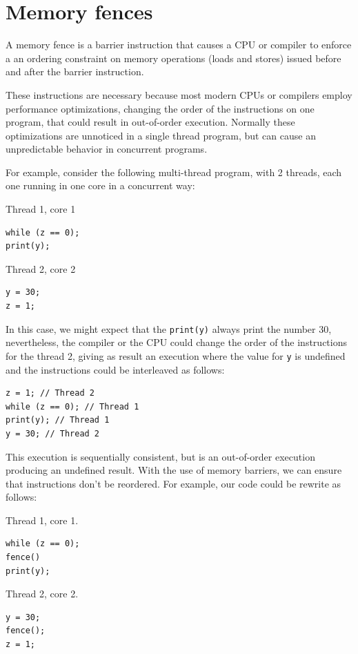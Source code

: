 \documentclass[openany, a4paper]{book}
\theoremstyle{break}
\theoremstyle{example}
\theoremstyle{note}
\theoremstyle{break}
\theoremstyle{exercise}
\begin{document}
\section{Memory fences}
\label{sec:org57f677f}

A memory fence is a barrier instruction that causes a CPU or compiler to
enforce a an ordering constraint on memory operations (loads and stores)
issued before and after the barrier instruction.

These instructions are necessary because most modern CPUs or compilers
employ performance optimizations, changing the order of the instructions on
one program, that could result in out-of-order execution. Normally these
optimizations are unnoticed in a single thread program, but can cause an
unpredictable behavior in concurrent programs.

For example, consider the following multi-thread program, with 2
threads, each one running in one core in a concurrent way:

Thread 1, core 1
\begin{verbatim}
while (z == 0);
print(y);
\end{verbatim}

Thread 2, core 2
\begin{verbatim}
y = 30;
z = 1;
\end{verbatim}

In this case, we might expect that the \texttt{print(y)} always print the number 30,
nevertheless, the compiler or the CPU could change the order of the
instructions for the thread 2, giving as result an execution where the value
for \texttt{y} is undefined and the instructions could be interleaved as follows:

\begin{verbatim}
z = 1; // Thread 2
while (z == 0); // Thread 1
print(y); // Thread 1
y = 30; // Thread 2
\end{verbatim}

This execution is sequentially consistent, but is an out-of-order
execution producing an undefined result. With the use of memory barriers, we
can ensure that instructions don't be reordered. For example, our code could
be rewrite as follows:

Thread 1, core 1.
\begin{verbatim}
while (z == 0);
fence()
print(y);
\end{verbatim}

Thread 2, core 2.
\begin{verbatim}
y = 30;
fence();
z = 1;
\end{verbatim}
\end{document}
